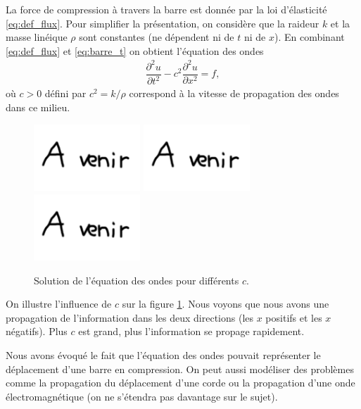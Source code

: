 \documentclass[12pt,a4paper,twoside]{article}
\begin{document}
La force de compression \`a travers la barre est donn\'ee par la loi d'\'elasticit\'e
\eqref{eq:def_flux}.
Pour simplifier la pr\'esentation, on consid\`ere que la raideur $k$ et la masse
lin\'eique $\rho$ sont constantes (ne d\'ependent ni de $t$ ni de $x$).
En combinant \eqref{eq:def_flux} et \eqref{eq:barre_t} on obtient l'\'equation des ondes
\begin{align}
  \label{eq:ondes}
  \dfrac{\partial^2 u}{\partial t^2} - c^2 \dfrac{\partial^2 u}{\partial x^2} = f ,
\end{align}
o\`u $c>0$ d\'efini par $c^2 = k/\rho$ correspond \`a la vitesse de propagation
des ondes dans ce milieu.



\begin{figure}[h]
  \centering
  \includegraphics[width = 4cm]{Figures/A_venir.png}
  \includegraphics[width = 4cm]{Figures/A_venir.png}
  \includegraphics[width = 4cm]{Figures/A_venir.png}
  \caption{Solution de l'\'equation des ondes
  pour diff\'erents $c$.}
  \label{fig:ondes_c}
\end{figure}


On illustre l'influence de $c$ sur la figure \ref{fig:ondes_c}.
Nous voyons que nous avons une propagation de l'information 
dans les deux directions (les $x$ positifs et les $x$ n\'egatifs).
Plus $c$ est grand, plus l'information se propage rapidement.


Nous avons \'evoqu\'e le fait que l'\'equation des ondes
pouvait repr\'esenter le d\'eplacement d'une barre en compression.
On peut aussi mod\'eliser des probl\`emes 
comme la propagation du d\'eplacement d'une corde ou
la propagation d'une onde \'electromagn\'etique
(on ne s'\'etendra pas davantage sur le sujet).
\end{document}
